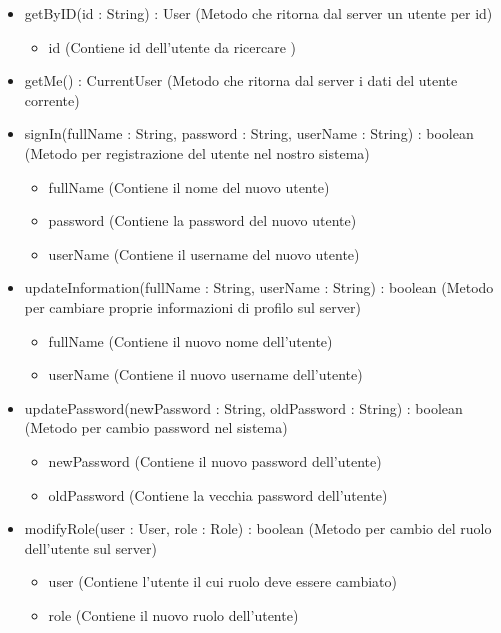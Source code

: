 \begin{description}
\begin{itemize}
\item getByID(id : String) : User (Metodo che ritorna dal server un utente per id)\begin{itemize}
\item id (Contiene id dell'utente da ricercare )
\end{itemize}

\item getMe() : CurrentUser (Metodo che ritorna dal server i dati del utente corrente)
\item signIn(fullName : String, password : String, userName : String) : boolean (Metodo per registrazione del utente nel nostro sistema)\begin{itemize}
\item fullName (Contiene il nome del nuovo utente)
\item password (Contiene la password del nuovo utente)
\item userName (Contiene il username del nuovo utente)
\end{itemize}

\item updateInformation(fullName : String, userName : String) : boolean (Metodo per cambiare proprie informazioni di profilo sul server)\begin{itemize}
\item fullName (Contiene il nuovo nome dell'utente)
\item userName (Contiene il nuovo username dell'utente)
\end{itemize}

\item updatePassword(newPassword : String, oldPassword : String) : boolean (Metodo per cambio password nel sistema)\begin{itemize}
\item newPassword (Contiene il nuovo password dell'utente)
\item oldPassword (Contiene la vecchia password dell'utente)
\end{itemize}

\item modifyRole(user : User, role : Role) : boolean (Metodo per cambio del ruolo dell'utente sul server)\begin{itemize}
\item user (Contiene l'utente il cui ruolo deve essere cambiato)
\item role (Contiene il nuovo ruolo dell'utente)
\end{itemize}

\end{itemize}

\end{description}

